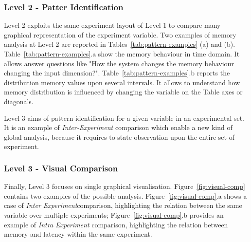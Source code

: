 \subsubsection{Level 2 - Patter Identification}\label{sec:impl-level2}

%  	



\noindent Level 2 exploits the same experiment layout of Level 1 to compare many graphical representation of the experiment variable. Two examples of memory analysis at Level 2 are reported in Tables~\ref{tab:pattern-examples} (a) and (b). Table~\ref{tab:pattern-examples}.a show the memory behaviour in time domain. It allows answer questions like "How the system changes the memory behaviour changing the input dimension?". Table~\ref{tab:pattern-examples}.b reports the distribution memory values upon several intervals. It allows to understand how memory distribution is influenced by changing the variable on the Table axes or diagonals.

Level 3 aims of pattern identification for a given variable in an experimental set. It is an example of \textit{Inter-Experiment} comparison which enable a new kind of global analysis, because it requires to state observation upon the entire set of experiment.

\subsubsection{Level 3 - Visual Comparison}\label{sec:impl-level3}

\noindent Finally, Level 3 focuses on single graphical visualisation. Figure~\ref{fig:visual-comp} contains two examples of the possible analysis. Figure~\ref{fig:visual-comp}.a shows a case of \textit{Inter Experiment}comparison, highlighting the relation between the same variable over multiple experiments; Figure~\ref{fig:visual-comp}.b provides an example of \textit{Intra Experiment} comparison, highlighting the relation between memory and latency within the same experiment.

